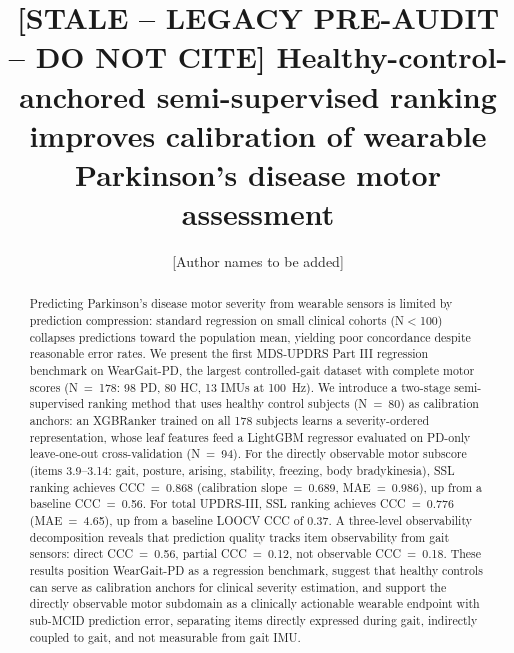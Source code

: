 \documentclass[11pt]{article}
\title{[STALE -- LEGACY PRE-AUDIT -- DO NOT CITE] Healthy-control-anchored semi-supervised ranking improves calibration of wearable Parkinson's disease motor assessment}
\author{[Author names to be added]}
\date{}
\begin{document}
\maketitle

\begin{center}
\end{center}

\begin{abstract}
Predicting Parkinson's disease motor severity from wearable sensors is limited by prediction compression: standard regression on small clinical cohorts (N$<$100) collapses predictions toward the population mean, yielding poor concordance despite reasonable error rates. We present the first MDS-UPDRS Part III regression benchmark on WearGait-PD, the largest controlled-gait dataset with complete motor scores (N~=~178: 98 PD, 80 HC, 13 IMUs at 100~Hz). We introduce a two-stage semi-supervised ranking method that uses healthy control subjects (N~=~80) as calibration anchors: an XGBRanker trained on all 178 subjects learns a severity-ordered representation, whose leaf features feed a LightGBM regressor evaluated on PD-only leave-one-out cross-validation (N~=~94). For the directly observable motor subscore (items 3.9--3.14: gait, posture, arising, stability, freezing, body bradykinesia), SSL ranking achieves CCC~=~0.868 (calibration slope~=~0.689, MAE~=~0.986), up from a baseline CCC~=~0.56. For total UPDRS-III, SSL ranking achieves CCC~=~0.776 (MAE~=~4.65), up from a baseline LOOCV CCC of 0.37. A three-level observability decomposition reveals that prediction quality tracks item observability from gait sensors: direct CCC~=~0.56, partial CCC~=~0.12, not observable CCC~=~0.18. These results position WearGait-PD as a regression benchmark, suggest that healthy controls can serve as calibration anchors for clinical severity estimation, and support the directly observable motor subdomain as a clinically actionable wearable endpoint with sub-MCID prediction error, separating items directly expressed during gait, indirectly coupled to gait, and not measurable from gait IMU.

\end{abstract}
\end{document}
